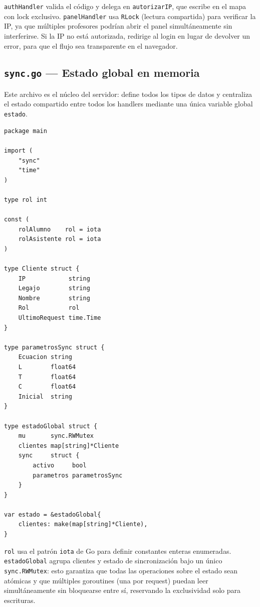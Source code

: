 \documentclass[12pt, a4paper]{article}
\begin{document}
\texttt{authHandler} valida el código y delega en \texttt{autorizarIP}, que escribe en
el mapa con lock exclusivo. \texttt{panelHandler} usa \texttt{RLock} (lectura
compartida) para verificar la IP, ya que múltiples profesores podrían abrir el panel
simultáneamente sin interferirse. Si la IP no está autorizada, redirige al login en
lugar de devolver un error, para que el flujo sea transparente en el navegador.

\subsection{\texttt{sync.go} — Estado global en memoria}

Este archivo es el núcleo del servidor: define todos los tipos de datos y centraliza el
estado compartido entre todos los handlers mediante una única variable global
\texttt{estado}.

\begin{lstlisting}[style=golang, caption={\texttt{sync.go} — tipos y estado global}]
package main

import (
    "sync"
    "time"
)

type rol int

const (
    rolAlumno    rol = iota
    rolAsistente rol = iota
)

type Cliente struct {
    IP            string
    Legajo        string
    Nombre        string
    Rol           rol
    UltimoRequest time.Time
}

type parametrosSync struct {
    Ecuacion string
    L        float64
    T        float64
    C        float64
    Inicial  string
}

type estadoGlobal struct {
    mu       sync.RWMutex
    clientes map[string]*Cliente
    sync     struct {
        activo     bool
        parametros parametrosSync
    }
}

var estado = &estadoGlobal{
    clientes: make(map[string]*Cliente),
}
\end{lstlisting}

\texttt{rol} usa el patrón \texttt{iota} de Go para definir constantes enteras
enumeradas. \texttt{estadoGlobal} agrupa clientes y estado de sincronización bajo un
único \texttt{sync.RWMutex}: esto garantiza que todas las operaciones sobre el estado
sean atómicas y que múltiples goroutines (una por request) puedan leer
simultáneamente sin bloquearse entre sí, reservando la exclusividad solo para
escrituras.
\end{document}
